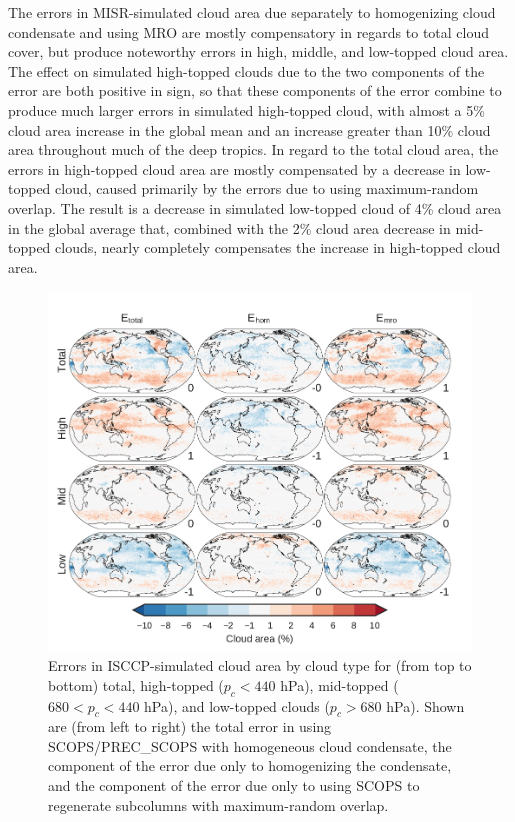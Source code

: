 The errors in MISR-simulated cloud area due separately to homogenizing
cloud condensate and using MRO are mostly compensatory in regards to
total cloud cover, but produce noteworthy errors in high, middle, and
low-topped cloud area. The effect on simulated high-topped clouds due to
the two components of the error are both positive in sign, so that these
components of the error combine to produce much larger errors in
simulated high-topped cloud, with almost a 5\% cloud area increase in
the global mean and an increase greater than 10\% cloud area throughout
much of the deep tropics. In regard to the total cloud area, the errors
in high-topped cloud area are mostly compensated by a decrease in
low-topped cloud, caused primarily by the errors due to using
maximum-random overlap. The result is a decrease in simulated low-topped
cloud of 4\% cloud area in the global average that, combined with the
2\% cloud area decrease in mid-topped clouds, nearly completely
compensates the increase in high-topped cloud area.

\begin{figure}[htbp]
\centering
\includegraphics{graphics/subgrid1_cldisccp_maps_diff.pdf}
\caption{\label{fig:subgrid1_cldisccp_errors}Errors in ISCCP-simulated
cloud area by cloud type for (from top to bottom) total, high-topped
(\(p_c < 440\) hPa), mid-topped (\(680 < p_c < 440\) hPa), and
low-topped clouds (\(p_c > 680\) hPa). Shown are (from left to right)
the total error in using SCOPS/PREC\_SCOPS with homogeneous cloud
condensate, the component of the error due only to homogenizing the
condensate, and the component of the error due only to using SCOPS to
regenerate subcolumns with maximum-random
overlap.}\label{fig:subgrid1ux5fcldisccpux5ferrors}
\end{figure}

